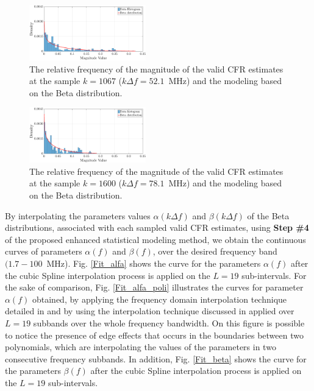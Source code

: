 \documentclass[journal]{IEEEtran}
\begin{document}
\begin{figure}[h!]
	\centering
	\includegraphics[width=0.45\textwidth]{images/Mag_hist_2.eps}
	\caption{The relative frequency of the magnitude of the valid \ac{CFR} estimates at the sample $k = 1067$ ($k\Delta f= 52.1$~MHz) and the modeling based on the Beta distribution.}
	\label{mag_example}
\end{figure}

\begin{figure}[h!]
	\centering
	\includegraphics[width=0.45\textwidth]{images/Mag_hist2_2.eps}
	\caption{The relative frequency of the magnitude of the valid \ac{CFR} estimates at the sample $k = 1600$ ($k\Delta f= 78.1$~MHz) and the modeling based on the Beta distribution.}
	\label{mag_example2}
\end{figure}

By interpolating the parameters values $\alpha(k\Delta f)$ and $\beta(k\Delta f)$ of the Beta distributions, associated with each sampled valid \ac{CFR} estimates, using \textbf{Step \#4} of the proposed enhanced statistical modeling method, we obtain the continuous curves of parameters $\alpha(f)$ and $\beta(f)$, over the desired frequency band $(1.7-100$~MHz). Fig. \ref{Fit_alfa} shows the curve for the parameters $\alpha(f)$ after the cubic Spline interpolation process is applied on the $L=19$ sub-intervals. For the sake of comparison, Fig. \ref{Fit_alfa_poli} illustrates the curves for parameter $\alpha(f)$ obtained, by applying the frequency domain interpolation technique detailed in \cite{mitra} and by using the interpolation technique discussed in \cite{Luis:AI} applied over $L=19$ subbands over the whole frequency bandwidth. On this figure is possible to notice the presence of edge effects that occurs in the boundaries between two polynomials, which are interpolating the values of the parameters in two consecutive frequency subbands. In addition, Fig. \ref{Fit_beta} shows the curve for the parameters $\beta(f)$ after the cubic Spline interpolation process is applied on the $L=19$ sub-intervals.
\end{document}
